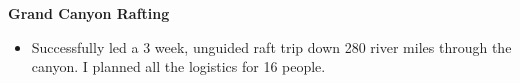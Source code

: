 \documentclass[11pt]{resume}
\begin{document}
\begin{minipage}[t]{1\textwidth}
      \vspace{.5em}
      {\bf Grand Canyon Rafting}
      \vspace{.5em}
      \begin{addmargin}[.5em]{0em}
        \begin{itemize}
          \setlength\itemsep{-.2em}

        \item {Successfully led a 3 week, unguided raft trip down 280 river
          miles through the canyon. I planned all the logistics for 16 people.}

        \end{itemize}
      \end{addmargin}
    \end{minipage}
\end{document}
